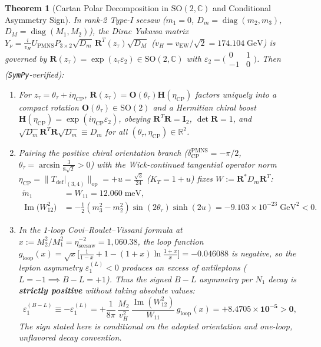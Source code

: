 \documentclass[11pt,a4paper]{article}
\newtheorem{theorem}{Theorem}[section]
\begin{document}
\begin{theorem}[Cartan Polar Decomposition in \texorpdfstring{$\mathrm{SO}(2,\mathbb{C})$}{SO(2,C)} and Conditional Asymmetry Sign]
\label{thm:casas-ibarra}
In rank-2 Type-I seesaw ($m_1 = 0$, $D_m = \operatorname{diag}(m_2, m_3)$, $D_M = \operatorname{diag}(M_1, M_2)$), the Dirac Yukawa matrix $Y_\nu = \frac{i}{v_H} U_{\mathrm{PMNS}} P_{3\times 2}\sqrt{D_m}\,\mathbf{R}^T(z_\tau)\sqrt{D_M}$ ($v_H = v_{\mathrm{EW}}/\sqrt{2} = 174.104\;\mathrm{GeV}$) is governed by $\mathbf{R}(z_\tau) = \exp(z_\tau\varepsilon_2) \in \mathrm{SO}(2,\mathbb{C})$ \cite{CasasIbarra2001,IbarraRoss2004} with $\varepsilon_2 = \bigl(\begin{smallmatrix}0 & 1\\ -1 & 0\end{smallmatrix}\bigr)$. Then (\texttt{SymPy}-verified):
\begin{enumerate}[label=(\alph*),leftmargin=1.8em,itemsep=2pt]
\item For $z_\tau = \theta_\tau + i\eta_{\mathrm{CP}}$, $\mathbf{R}(z_\tau) = \mathbf{O}(\theta_\tau)\mathbf{H}(\eta_{\mathrm{CP}})$ factors uniquely into a compact rotation $\mathbf{O}(\theta_\tau) \in \mathrm{SO}(2)$ and a Hermitian chiral boost $\mathbf{H}(\eta_{\mathrm{CP}}) = \exp(i\eta_{\mathrm{CP}}\varepsilon_2)$, obeying $\mathbf{R}^T\mathbf{R} = \mathbf{I}_2$, $\det\mathbf{R} = 1$, and $\sqrt{D_m}\mathbf{R}^T\mathbf{R}\sqrt{D_m} \equiv D_m$ for all $(\theta_\tau, \eta_{\mathrm{CP}}) \in \mathbb{R}^2$.
\item Pairing the positive chiral orientation branch ($\delta_{\mathrm{CP}}^{\mathrm{PMNS}} = -\pi/2$, $\theta_\tau = \arcsin\frac{3}{8\sqrt{2}} > 0$) with the Wick-continued tangential operator norm $\eta_{\mathrm{CP}} = \|T_{\mathrm{def}}|_{(3,4)}\|_{\mathrm{op}} = +u = \frac{\sqrt{3}}{24}$ ($K_T = 1 + u$) fixes $W := \mathbf{R}^* D_m \mathbf{R}^T$:
\begin{align}
\tilde{m}_1 &= W_{11} = 12.060\;\mathrm{meV}, \nonumber\\
\operatorname{Im}\bigl(W_{12}^2\bigr) &= -\frac{1}{2}(m_3^2 - m_2^2)\sin(2\theta_\tau)\sinh(2u) = -9.103\times 10^{-23}\;\mathrm{GeV}^2 < 0.
\end{align}
\item In the 1-loop Covi--Roulet--Vissani formula \cite{CoviRouletVissani1996} at $x := M_2^2/M_1^2 = \eta_{\mathrm{seesaw}}^{-2} = 1{,}060.38$, the loop function $g_{\mathrm{loop}}(x) = \sqrt{x}\bigl[\frac{1}{1-x} + 1 - (1+x)\ln\frac{1+x}{x}\bigr] = -0.046088$ is negative, so the lepton asymmetry $\varepsilon_1^{(L)} < 0$ produces an excess of antileptons ($L = -1 \implies B - L = +1$). Thus the signed $B - L$ asymmetry per $N_1$ decay is \textbf{strictly positive} without taking absolute values:
\begin{equation}
\varepsilon_1^{(B-L)} \equiv -\varepsilon_1^{(L)} = +\frac{1}{8\pi}\,\frac{M_2}{v_H^2}\,\frac{\operatorname{Im}(W_{12}^2)}{W_{11}}\,g_{\mathrm{loop}}(x) = \mathbf{+8.4705\times 10^{-5} > 0},
\label{eq:eps1}
\end{equation}
The sign stated here is conditional on the adopted orientation and one-loop, unflavored decay convention.
\end{enumerate}
\end{theorem}
\end{document}
